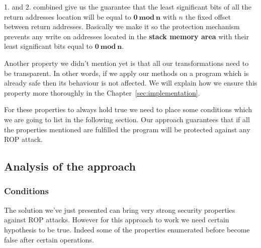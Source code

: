 \documentclass[11pt]{sdm}
\begin{document}
1. and 2. combined give us the guarantee that the least significant bits of all the return addresses location will be equal to $\mathbf{0~mod~n}$ with $n$ the fixed offset between return addresses.
Basically we make it so the protection mechanism prevents any write on addresses located in the \textbf{stack memory area} with their least significant bits equal to $\mathbf{0~mod~n}$.

\hfill \break 
Another property we didn't mention yet is that all our transformations need to be transparent. In other words, if we apply our methods on a program which is already safe then its behaviour is not affected. We will explain how we ensure this property more thoroughly in the Chapter~\ref{sec:implementation}.

\hfill \break 
For these properties to always hold true we need to place some conditions which we are going to list in the following section. Our approach guarantees that if all the properties mentioned are fulfilled the program will be protected against any ROP attack.

\subsection{Analysis of the approach}
\label{sub:Analysis of the approach}

\subsubsection{Conditions}
\label{ssub:Conditions}

The solution we've just presented can bring very strong security properties against ROP attacks. However for this approach to work we need certain hypothesis to be true. Indeed some of the properties enumerated before become false after certain operations.
\end{document}

